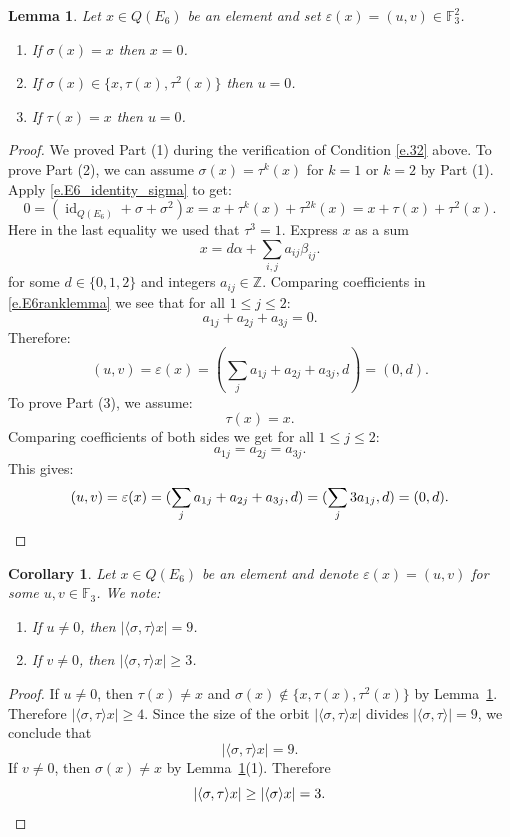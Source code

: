 \documentclass[12pt]{amsart}
\numberwithin{equation}{section}
\newtheorem{lemma}[theorem]{Lemma}
\newtheorem{corollary}[theorem]{Corollary}
\theoremstyle{definition}
\newcommand{\bF}{\mathbb{F}}
\newcommand{\bZ}{\mathbb{Z}}
\newcommand{\id}{\operatorname{id}}
\newcommand{\eps}{\varepsilon}
\begin{document}
\begin{lemma}\label{lem.E6rank}
    Let $x\in Q(E_6)$ be an element and set $\eps(x) =(u,v) \in \bF_3^2$.
    \begin{enumerate}
        \item If $\sigma(x) = x$ then $x =0$.
        \item If $\sigma(x)\in \{ x, \tau(x),\tau^2(x)\}$ then $u =0$.
        \item If $\tau(x) = x$ then $u =0$.
    \end{enumerate}
\end{lemma}
\begin{proof}
    
    We proved Part (1) during the verification of Condition \eqref{e.32} above. To prove Part (2), we can assume $\sigma(x)= \tau^k(x)$ for $k=1$ or $k=2$ by Part (1). Apply \eqref{e.E6_identity_sigma} to get:
    \begin{equation}\label{e.E6ranklemma}
        0 = (\id_{Q(E_6)} + \sigma + \sigma^2)x = x + \tau^k(x) + \tau^{2k}(x)=  x+ \tau(x)+ \tau^2(x).
    \end{equation}
    Here in the last equality we used that $\tau^3 =1$. Express $x$ as a sum
    $$ x = d \alpha + \sum_{i,j} a_{ij}\beta_{ij}.$$
    for some $d\in \{0,1,2\}$ and integers $a_{ij}\in \bZ$. Comparing coefficients in \eqref{e.E6ranklemma} we see that for all $1 \leq j\leq 2$:
    $$a_{1j} + a_{2j} + a_{3j} = 0.$$
    Therefore:
    $$(u,v) = \eps(x) = (\sum_{j}a_{1j} + a_{2j} + a_{3j}, d) = (0,d).$$
    To prove Part (3), we assume:
    $$\tau(x) = x.$$
    Comparing coefficients of both sides we get for all $1\leq j\leq 2$:
    $$a_{1j} = a_{2j} = a_{3j}.$$
    This gives:
    \[(u,v) = \eps(x) = (\sum_{j}a_{1j} + a_{2j} + a_{3j}, d) = (\sum_j 3a_{1j},d)= (0,d).\qedhere\]
\end{proof}

\begin{corollary}\label{cor.E6stabxnotzero}
     Let $x\in Q(E_6)$ be an element and denote $\eps(x) = (u,v)$ for some $u,v \in \bF_3$. We note:
 \begin{enumerate}
     \item  If $u\neq 0$, then $|\langle \sigma, \tau\rangle x|  = 9$.
    \item If $v\neq 0$, then $ |\langle \sigma, \tau\rangle x| \geq 3$.
 \end{enumerate} 
\end{corollary}
\begin{proof}
If $u\neq 0$, then $\tau(x) \neq x $ and $\sigma(x) \not \in  \{x,\tau(x),\tau^2(x)\}$ by Lemma~\ref{lem.E6rank}. Therefore $|\langle \sigma,\tau \rangle x|\geq 4$. Since the size of the orbit $|\langle \sigma,\tau \rangle x|$ divides $|\langle \sigma,\tau \rangle | = 9$, we conclude that 
    $$|\langle \sigma, \tau\rangle x|  = 9.$$
If $v\neq 0$, then $\sigma(x) \neq x$ by Lemma~\ref{lem.E6rank}(1). Therefore 
\[|\langle \sigma, \tau\rangle x| \geq |\langle \sigma \rangle x| = 3.\qedhere\]
\end{proof}
\end{document}
